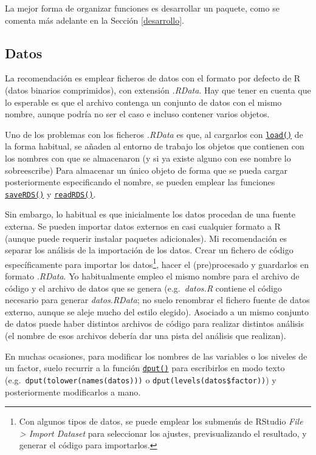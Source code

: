 \documentclass[
]{book}
\theoremstyle{break}
\theoremstyle{nonumberplain}
\begin{document}
La mejor forma de organizar funciones es desarrollar un paquete, como se comenta más adelante en la Sección \ref{desarrollo}.

\hypertarget{datos}{%
\subsection{Datos}\label{datos}}

La recomendación es emplear ficheros de datos con el formato por defecto de R (datos binarios comprimidos), con extensión \emph{.RData}.
Hay que tener en cuenta que lo esperable es que el archivo contenga un conjunto de datos con el mismo nombre, aunque podría no ser el caso e incluso contener varios objetos.

Uno de los problemas con los ficheros \emph{.RData} es que, al cargarlos con \href{https://rdrr.io/r/base/load.html}{\texttt{load()}} de la forma habitual, se añaden al entorno de trabajo los objetos que contienen con los nombres con que se almacenaron (y si ya existe alguno con ese nombre lo sobreescribe)
Para almacenar un único objeto de forma que se pueda cargar posteriormente especificando el nombre, se pueden emplear las funciones \href{https://rdrr.io/r/base/readRDS.html}{\texttt{saveRDS()}} y \href{https://rdrr.io/r/base/readRDS.html}{\texttt{readRDS()}}.

Sin embargo, lo habitual es que inicialmente los datos procedan de una fuente externa.
Se pueden importar datos externos en casi cualquier formato a R (aunque puede requerir instalar paquetes adicionales).
Mi recomendación es separar los análisis de la importación de los datos.
Crear un fichero de código específicamente para importar los datos\footnote{Con algunos tipos de datos, se puede emplear los submenús de RStudio \emph{File \textgreater{} Import Dataset} para seleccionar los ajustes, previsualizando el resultado, y generar el código para importarlos.}, hacer el (pre)procesado y guardarlos en formato \emph{.RData}.
Yo habitualmente empleo el mismo nombre para el archivo de código y el archivo de datos que se genera (e.g.~\emph{datos.R} contiene el código necesario para generar \emph{datos.RData}; no suelo renombrar el fichero fuente de datos externo, aunque se aleje mucho del estilo elegido).
Asociado a un mismo conjunto de datos puede haber distintos archivos de código para realizar distintos análisis (el nombre de esos archivos debería dar una pista del análisis que realizan).

En muchas ocasiones, para modificar los nombres de las variables o los niveles de un factor, suelo recurrir a la función \href{https://rdrr.io/r/base/dput.html}{\texttt{dput()}} para escribirlos en modo texto (e.g.~\texttt{dput(tolower(names(datos)))} o \texttt{dput(levels(datos\$factor))}) y posteriormente modificarlos a mano.
\end{document}
